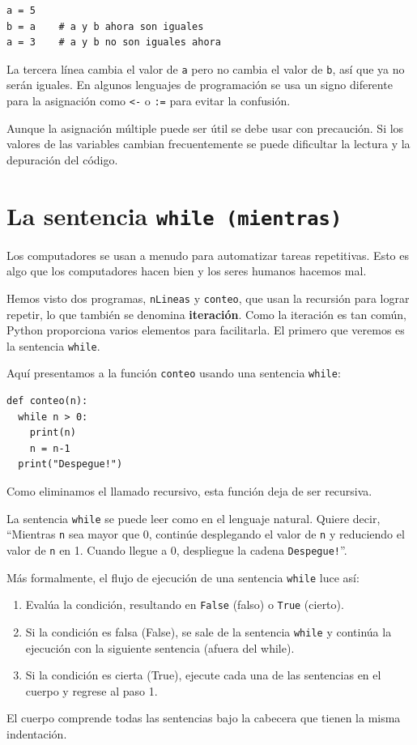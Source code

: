 \begin{verbatim}
a = 5
b = a    # a y b ahora son iguales
a = 3    # a y b no son iguales ahora
\end{verbatim}
 La tercera línea cambia el valor de \texttt{a} pero no cambia el
valor de \texttt{b}, así que ya no serán iguales. En algunos lenguajes
de programación se usa un signo diferente para la asignación como
\texttt{<-} o \texttt{:=} para evitar la confusión.

Aunque la asignación múltiple puede ser útil se debe usar con precaución.
Si los valores de las variables cambian frecuentemente se puede dificultar
la lectura y la depuración del código.

\section{La sentencia \texttt{while (mientras)} }

  

Los computadores se usan a menudo para automatizar tareas repetitivas.
Esto es algo que los computadores hacen bien y los seres humanos hacemos
mal.

Hemos visto dos programas, \texttt{nLineas} y \texttt{conteo}, que
usan la recursión para lograr repetir, lo que también se denomina
\textbf{iteración}. Como la iteración es tan común, Python proporciona
varios elementos para facilitarla. El primero que veremos es la sentencia
\texttt{while}.

Aquí presentamos a la función \texttt{conteo} usando una sentencia
\texttt{while}:

\begin{verbatim}
def conteo(n):
  while n > 0:
    print(n)
    n = n-1
  print("Despegue!")
\end{verbatim}
 Como eliminamos el llamado recursivo, esta función deja de ser recursiva.

La sentencia \texttt{while} se puede leer como en el lenguaje natural.
Quiere decir, ``Mientras \texttt{n} sea mayor que 0, continúe desplegando
el valor de \texttt{n} y reduciendo el valor de \texttt{n} en 1. Cuando
llegue a 0, despliegue la cadena \texttt{Despegue!}''.

Más formalmente, el flujo de ejecución de una sentencia \texttt{while}
luce así:
\begin{enumerate}
\item Evalúa la condición, resultando en \texttt{False} (falso) o \texttt{True}
(cierto).
\item Si la condición es falsa (False), se sale de la sentencia \texttt{while}
y continúa la ejecución con la siguiente sentencia (afuera del while).
\item Si la condición es cierta (True), ejecute cada una de las sentencias
en el cuerpo y regrese al paso 1.
\end{enumerate}
El cuerpo comprende todas las sentencias bajo la cabecera que tienen
la misma indentación.

